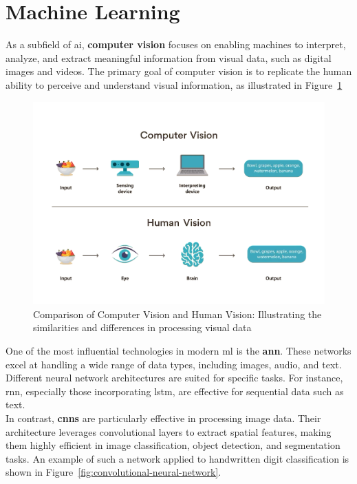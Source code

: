 \section{Machine Learning} \label{sec:machine-learning}

As a subfield of \gls{ai}, \textbf{computer vision} focuses on enabling machines to interpret, analyze, and extract meaningful information from visual data, such as digital images and videos. The primary goal of computer vision is to replicate the human ability to perceive and understand visual information, as illustrated in Figure~\ref{fig:computer-vision}

\begin{figure}[h!] \centering \includegraphics[width=0.75\linewidth]{figures/theory/machine-learning/computer-vision.png} \caption[Computer Vision vs. Human Vision]{Comparison of Computer Vision and Human Vision: Illustrating the similarities and differences in processing visual data \cite{turing:computer-vision}} \label{fig:computer-vision} \end{figure}

One of the most influential technologies in modern \gls{ml} is the \textbf{\gls{ann}}. These networks excel at handling a wide range of data types, including images, audio, and text. Different neural network architectures are suited for specific tasks. For instance, \gls{rnn}, especially those incorporating \gls{lstm}, are effective for sequential data such as text. \\

In contrast, \textbf{\glspl{cnn}} are particularly effective in processing image data. Their architecture leverages convolutional layers to extract spatial features, making them highly efficient in image classification, object detection, and segmentation tasks. An example of such a network applied to handwritten digit classification is shown in Figure~\ref{fig:convolutional-neural-network}. \\

